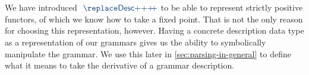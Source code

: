 \begin{code}[hide]%
\>[0]\AgdaSpace{}%
\AgdaSpace{}%
\<%
\end{code}

\begin{code}%
\>[0][@{}l@{\AgdaIndent{1}}]%
\>[4]\AgdaSpace{}%
\AgdaSpace{}%
\AgdaSymbol{:}\AgdaSpace{}%
\AgdaSpace{}%
\<%
\\
\>[4][@{}l@{\AgdaIndent{0}}]%
\>[8]%
\>[13]\AgdaSymbol{:}\AgdaSpace{}%
\<%
\\
%
\>[8]%
\>[13]\AgdaSymbol{:}\AgdaSpace{}%
\<%
\\
%
\>[8]%
\>[13]\AgdaSymbol{:}\AgdaSpace{}%
\AgdaSpace{}%
\AgdaSpace{}%
\<%
\\
%
\>[8]%
\>[13]\AgdaSymbol{:}\AgdaSpace{}%
\AgdaSpace{}%
\AgdaSpace{}%
\AgdaSpace{}%
\AgdaSpace{}%
\<%
\\
%
\>[8]%
\>[13]\AgdaSymbol{:}\AgdaSpace{}%
\AgdaSpace{}%
\AgdaSpace{}%
\AgdaSpace{}%
\AgdaSpace{}%
\<%
\\
%
\>[8]%
\>[13]\AgdaSymbol{:}\AgdaSpace{}%
\AgdaSymbol{\{}\AgdaSpace{}%
\AgdaSymbol{:}\AgdaSpace{}%
\AgdaSymbol{\}}\AgdaSpace{}%
\AgdaSpace{}%
\AgdaSpace{}%
\AgdaSpace{}%
\AgdaSpace{}%
\AgdaSpace{}%
\AgdaSpace{}%
\<%
\\
%
\>[8]%
\>[13]\AgdaSymbol{:}\AgdaSpace{}%
\<%
\end{code}
\begin{remark}
We have introduced $\af{Desc}$ to be able to represent strictly positive
functors, of which we know how to take a fixed point. 
That is not the only reason for choosing this representation, however.
Having a concrete description data type as a representation of our grammars
gives us the ability to symbolically manipulate the grammar.
We use this later in \cref{sec:parsing-in-general} to define what it means to
take the derivative of a grammar description.
\end{remark}

